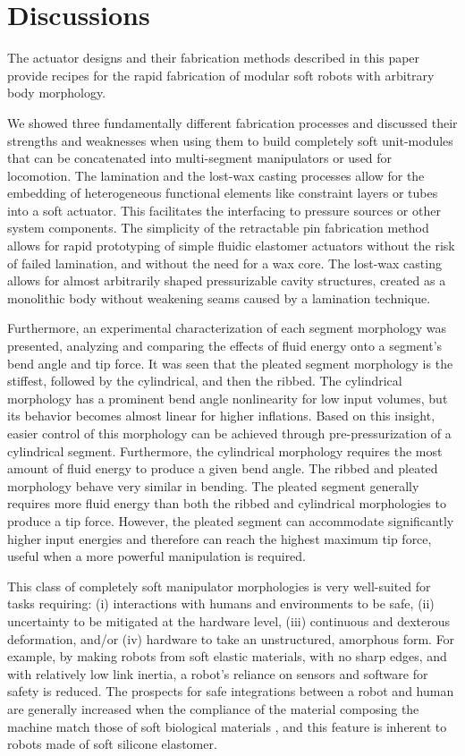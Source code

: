 \section{Discussions}
\label{sec:discussions}
The actuator designs and their fabrication methods described in this paper provide recipes for the rapid fabrication of modular soft robots with arbitrary body morphology.

We showed three fundamentally different fabrication processes and discussed their strengths and weaknesses when using them to build completely soft unit-modules that can be concatenated into multi-segment manipulators or used for locomotion.
%
The lamination and the lost-wax casting processes allow for the embedding of heterogeneous functional elements like constraint layers or tubes into a soft actuator.
This facilitates the interfacing to pressure sources or other system components.
The simplicity of the retractable pin fabrication method allows for rapid prototyping of simple fluidic elastomer actuators without the risk of failed lamination, and without the need for a wax core.
The lost-wax casting allows for almost arbitrarily shaped pressurizable cavity structures, created as a monolithic body without weakening seams caused by a lamination technique.

Furthermore, an experimental characterization of each segment morphology was presented, analyzing and comparing the effects of fluid energy onto a segment's bend angle and tip force.
It was seen that the pleated segment morphology is the stiffest, followed by the cylindrical, and then the ribbed.
The cylindrical morphology has a prominent bend angle nonlinearity for low input volumes, but its behavior becomes almost linear for higher inflations.
Based on this insight, easier control of this morphology can be achieved through pre-pressurization of a cylindrical segment.
Furthermore, the cylindrical morphology requires the most amount of fluid energy to produce a given bend angle.
The ribbed and pleated morphology behave very similar in bending.
The pleated segment generally requires more fluid energy than both the ribbed and cylindrical morphologies to produce a tip force.
However, the pleated segment can accommodate significantly higher input energies and therefore can reach the highest maximum tip force, useful when a more powerful manipulation is required.

This class of completely soft manipulator morphologies is very well-suited for tasks requiring: (i) interactions with humans and environments to be safe, (ii) uncertainty to be mitigated at the hardware level, (iii) continuous and dexterous deformation, and/or (iv) hardware to take an unstructured, amorphous form.
%
For example, by making robots from soft elastic materials, with no sharp edges, and with relatively low link inertia, a robot's reliance on sensors and software for safety is reduced.
%
The prospects for safe integrations between a robot and human are generally increased when the compliance of the material composing the machine match those of soft biological materials \citep{majidi2014soft}, and this feature is inherent to robots made of soft silicone elastomer.

